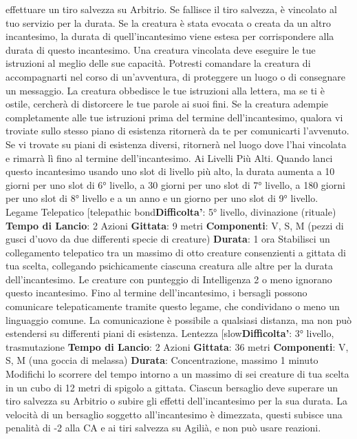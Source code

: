 \begin{multicols}{2}
effettuare un tiro salvezza su Arbitrio. Se fallisce il tiro
salvezza, è vincolato al tuo servizio per la durata. Se la
creatura è stata evocata o creata da un altro
incantesimo, la durata di quell’incantesimo viene estesa
per corrispondere alla durata di questo incantesimo.
Una creatura vincolata deve eseguire le tue istruzioni al
meglio delle sue capacità. Potresti comandare la
creatura di accompagnarti nel corso di un’avventura, di
proteggere un luogo o di consegnare un messaggio. La
creatura obbedisce le tue istruzioni alla lettera, ma se ti
è ostile, cercherà di distorcere le tue parole ai suoi fini.
Se la creatura adempie completamente alle tue
istruzioni prima del termine dell’incantesimo, qualora vi
troviate sullo stesso piano di esistenza ritornerà da te
per comunicarti l’avvenuto. Se vi trovate su piani di
esistenza diversi, ritornerà nel luogo dove l’hai vincolata
e rimarrà lì fino al termine dell’incantesimo.
Ai Livelli Più Alti. Quando lanci questo incantesimo
usando uno slot di livello più alto, la durata aumenta a
10 giorni per uno slot di 6° livello, a 30 giorni per uno
slot di 7° livello, a 180 giorni per uno slot di 8° livello e a
un anno e un giorno per uno slot di 9° livello.
Legame Telepatico
[telepathic bond\textbf{Difficolta'}:
5° livello, divinazione (rituale)
\textbf{Tempo di Lancio}: 2 Azioni
\textbf{Gittata}: 9 metri
\textbf{Componenti}: V, S, M (pezzi di gusci d’uovo da due
differenti specie di creature)
\textbf{Durata}: 1 ora
Stabilisci un collegamento telepatico tra un massimo di
otto creature consenzienti a gittata di tua scelta,
collegando psichicamente ciascuna creatura alle altre
per la durata dell’incantesimo. Le creature con
punteggio di Intelligenza 2 o meno ignorano questo
incantesimo.
Fino al termine dell’incantesimo, i bersagli possono
comunicare telepaticamente tramite questo legame,
che condividano o meno un linguaggio comune. La
comunicazione è possibile a qualsiasi distanza, ma non
può estendersi su differenti piani di esistenza.
Lentezza
[slow\textbf{Difficolta'}:
3° livello, trasmutazione
\textbf{Tempo di Lancio}: 2 Azioni
\textbf{Gittata}: 36 metri
\textbf{Componenti}: V, S, M (una goccia di melassa)
\textbf{Durata}: Concentrazione, massimo 1 minuto
Modifichi lo scorrere del tempo intorno a un massimo di
sei creature di tua scelta in un cubo di 12 metri di
spigolo a gittata. Ciascun bersaglio deve superare un
tiro salvezza su Arbitrio o subire gli effetti
dell’incantesimo per la sua durata.
La velocità di un bersaglio soggetto all’incantesimo è
dimezzata, questi subisce una penalità di -2 alla CA e ai
tiri salvezza su Agilià, e non può usare reazioni.

\end{multicols}
